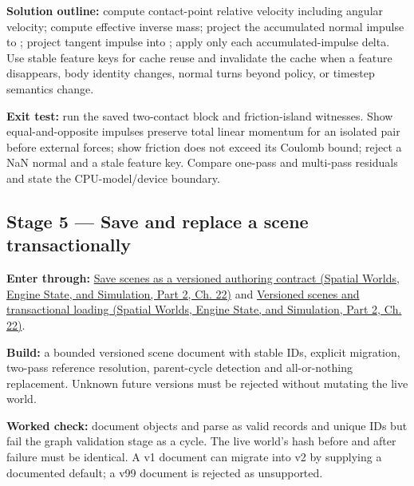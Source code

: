 \textbf{Solution outline:} compute contact-point relative velocity including angular velocity; compute effective inverse mass; project the accumulated normal impulse to ; project tangent impulse into ; apply only each accumulated-impulse delta. Use stable feature keys for cache reuse and invalidate the cache when a feature disappears, body identity changes, normal turns beyond policy, or timestep semantics change.

\textbf{Exit test:} run the saved two-contact block and friction-island witnesses. Show equal-and-opposite impulses preserve total linear momentum for an isolated pair before external forces; show friction does not exceed its Coulomb bound; reject a NaN normal and a stale feature key. Compare one-pass and multi-pass residuals and state the CPU-model/device boundary.

\subsection{Stage 5 --- Save and replace a scene transactionally}\label{06-engine-ii-ch042-stage-5-save-and-replace-a-scene-transactionally}

\hypertarget{06-engine-ii-ch042-stage-5-save-and-replace-a-scene-transactionally}{}

\textbf{Enter through:} \href{../05-Spatial-Worlds-Engine-State-and-Simulation-P02/main.pdf\#nameddest=06-engine-ii-ch033-save-scenes-as-a-versioned-authoring-contract}{Save scenes as a versioned authoring contract (Spatial Worlds, Engine State, and Simulation, Part 2, Ch. 22)} and \href{../05-Spatial-Worlds-Engine-State-and-Simulation-P02/main.pdf\#nameddest=06-engine-ii-ch033-save-scenes-as-a-versioned-authoring-contract}{Versioned scenes and transactional loading (Spatial Worlds, Engine State, and Simulation, Part 2, Ch. 22)}.

\textbf{Build:} a bounded versioned scene document with stable IDs, explicit migration, two-pass reference resolution, parent-cycle detection and all-or-nothing replacement. Unknown future versions must be rejected without mutating the live world.

\textbf{Worked check:} document objects  and  parse as valid records and unique IDs but fail the graph validation stage as a cycle. The live world's hash before and after failure must be identical. A v1 document can migrate into v2 by supplying a documented default; a v99 document is rejected as unsupported.

